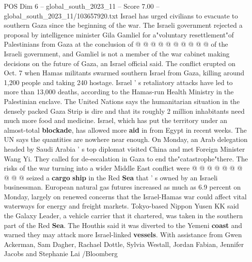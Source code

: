 \begin{textsample}{POS Dim 6 – global\_south\_2023\_11 – Score 7.00 – global\_south\_2023\_11/103657920.txt}
Israel has urged civilians to evacuate to southern Gaza since the beginning of the war.
The Israeli government rejected a proposal by intelligence minister Gila Gamliel for a"voluntary resettlement"of Palestinians from Gaza at the conclusion of @ @ @ @ @ @ @ @ @ @ of the Israeli government, and Gamliel is not a member of the war cabinet making decisions on the future of Gaza, an Israel official said.
The conflict erupted on Oct. 7 when Hamas militants swarmed southern Israel from Gaza, killing around 1,200 people and taking 240 hostage.
Israel ' s retaliatory attacks have led to more than 13,000 deaths, according to the Hamas-run Health Ministry in the Palestinian enclave.
The United Nations says the humanitarian situation in the densely packed Gaza Strip is dire and that its roughly 2 million inhabitants need much more food and medicine.
Israel, which has put the territory under an almost-total \textbf{blockade}, has allowed more \textbf{aid} in from Egypt in recent weeks.
The UN says the quantities are nowhere near enough.
On Monday, an Arab delegation headed by Saudi Arabia ' s top diplomat visited China and met Foreign Minister Wang Yi.
They called for de-escalation in Gaza to end the"catastrophe"there.
The risks of the war turning into a wider Middle East conflict were @ @ @ @ @ @ @ @ @ @ seized a \textbf{cargo} \textbf{ship} in the Red \textbf{Sea} that ' s owned by an Israeli businessman.
European natural gas futures increased as much as 6.9 percent on Monday, largely on renewed concerns that the Israel-Hamas war could affect vital waterways for energy and freight markets.
Tokyo-based Nippon Yusen KK said the Galaxy Leader, a vehicle carrier that it chartered, was taken in the southern part of the Red \textbf{Sea}.
The Houthis said it was diverted to the Yemeni \textbf{coast} and warned they may attack more Israel-linked \textbf{vessels}.
With assistance from Gwen Ackerman, Sam Dagher, Rachael Dottle, Sylvia Westall, Jordan Fabian, Jennifer Jacobs and Stephanie Lai /Bloomberg

\end{textsample}
